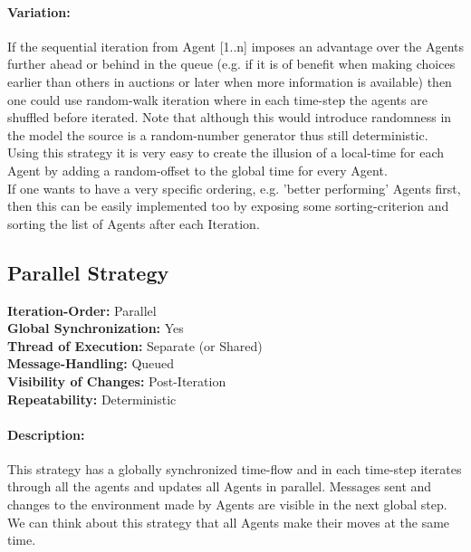 \paragraph{Variation:} If the sequential iteration from Agent [1..n] imposes an advantage over the Agents further ahead or behind in the queue (e.g. if it is of benefit when making choices earlier than others in auctions or later when more information is available) then one could use random-walk iteration where in each time-step the agents are shuffled before iterated. Note that although this would introduce randomness in the model the source is a random-number generator thus still deterministic. \\
Using this strategy it is very easy to create the illusion of a local-time for each Agent by adding a random-offset to the global time for every Agent. \\
If one wants to have a very specific ordering, e.g. 'better performing' Agents first, then this can be easily implemented too by exposing some sorting-criterion and sorting the list of Agents after each Iteration.

\subsection{Parallel Strategy}
\textbf{Iteration-Order:} Parallel \\
\textbf{Global Synchronization:} Yes \\
\textbf{Thread of Execution:} Separate (or Shared) \\
\textbf{Message-Handling:} Queued \\
\textbf{Visibility of Changes:}	Post-Iteration \\
\textbf{Repeatability:}	Deterministic 

\paragraph{Description:} This strategy has a globally synchronized time-flow and in each time-step iterates through all the agents and updates all Agents in parallel. Messages sent and changes to the environment made by Agents are visible in the next global step. We can think about this strategy that all Agents make their moves at the same time. 

